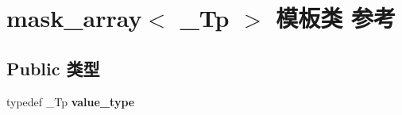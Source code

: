 \hypertarget{classmask__array}{}\section{mask\+\_\+array$<$ \+\_\+\+Tp $>$ 模板类 参考}
\label{classmask__array}
\subsection*{Public 类型}
\begin{DoxyCompactItemize}
\item 
\mbox{\label{classmask__array_acf8c151e398be6530ac062ecb458a3cb}} 
typedef \+\_\+\+Tp {\bfseries value\+\_\+type}
\end{DoxyCompactItemize}

